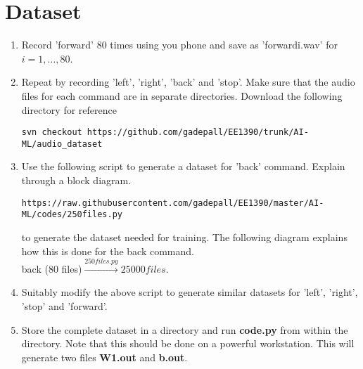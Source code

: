 \documentclass[journal,12pt,twocolumn]{IEEEtran}
\renewcommand\thesection{\arabic{section}}
\begin{document}
\section{Dataset}
%
\begin{enumerate}[label=\thesection.\arabic*
,ref=\thesection.\theenumi]

\item Record 'forward' 80 times using you phone and save as 'forwardi.wav' for $i 
= 1,\dots, 80$.
%
\item Repeat by recording 'left', 'right', 'back' and 'stop'. Make sure that the 
audio files for each command are in separate directories. Download the following 
directory for reference
\begin{lstlisting}
svn checkout https://github.com/gadepall/EE1390/trunk/AI-ML/audio_dataset
\end{lstlisting}
\item Use the following script to generate a dataset for 'back' command. Explain 
through a block diagram.
\begin{lstlisting}
https://raw.githubusercontent.com/gadepall/EE1390/master/AI-ML/codes/250files.py
\end{lstlisting}
%
\solution
to generate the dataset needed for training. The following diagram explains how this 
is done for the back command.
\\
back (80 files)$\overset{250files.py}{\rightarrow}25000 files$.
\item Suitably modify the above script to generate similar datasets for 'left', 'right', 'stop' and 'forward'. 
%
\item Store the complete dataset in a directory and run \textbf{code.py} from  within the 
directory.  Note that this should be done on a powerful workstation. This will generate two files
\textbf{W1.out} and \textbf{b.out}.
\end{enumerate}
%

%
%	


%
\end{document}
